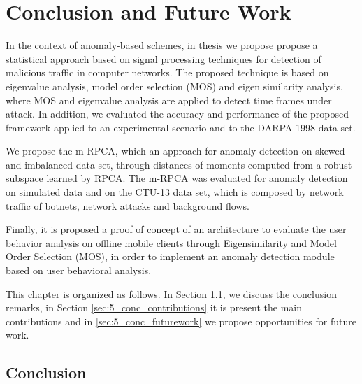 \chapter{Conclusion and Future Work}
\label{ch:5_conclusionfuturework}

In the context of anomaly-based schemes, in thesis  we propose propose a statistical approach based on signal processing techniques for detection of malicious traffic in computer networks. The proposed technique is based on eigenvalue analysis, model order selection (MOS) and eigen similarity analysis, where MOS and eigenvalue analysis are applied to detect time frames under attack. In addition, we evaluated the accuracy and performance of the proposed framework applied to an experimental scenario and to the DARPA 1998 data set. 

We propose the m-RPCA, which an approach for anomaly detection on skewed and imbalanced data set, through distances of moments computed from a robust subspace learned by RPCA. The m-RPCA was evaluated for anomaly detection on simulated data and on the CTU-13 data set, which is composed by network traffic of botnets, network attacks and background flows.

Finally, it is proposed a proof of concept of an architecture to evaluate the user behavior analysis on offline mobile clients through Eigensimilarity and Model Order Selection (MOS), in order to implement an anomaly detection module based on user behavioral analysis.

This chapter is organized as follows. In Section \ref{sec:5_conc_conclusion}, we discuss the conclusion remarks, in Section \ref{sec:5_conc_contributions} it is present the main contributions and in \ref{sec:5_conc_futurework} we propose opportunities for future work.

\section{Conclusion}
\label{sec:5_conc_conclusion}

